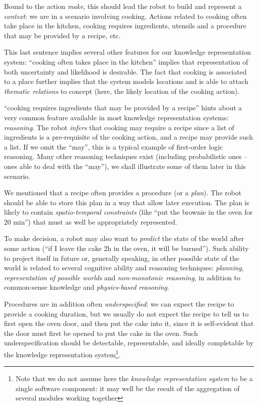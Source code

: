Bound to the action \emph{make}, this should lead the robot to build and
represent a \emph{context}: we are in a scenario involving cooking. Actions
related to cooking often take place in the kitchen, cooking requires ingredients, 
utensils and a procedure that may be provided by a recipe, etc.

This last sentence implies several other features for our knowledge
representation system: ``cooking often takes place in the kitchen'' implies
that representation of both uncertainty and likelihood is desirable. The fact
that cooking is associated to a place further implies that the system models
locations and is able to attach \emph{thematic relations} to concept
(here, the likely location of the cooking action).

``cooking requires ingredients that may be provided by a recipe'' hints about a
very common feature available in most knowledge representation systems:
\emph{reasoning}. The robot \emph{infers} that cooking may require a recipe
since a list of ingredients is a pre-requisite of the cooking action, and a
recipe may provide such a list. If we omit the ``may'', this is a typical
example of first-order logic reasoning. Many other reasoning techniques exist
(including probabilistic ones -- ones able to deal with the ``may''), we shall
illustrate some of them later in this scenario.

We mentioned that a recipe often provides a procedure (or a \emph{plan}). The robot
should be able to store this plan in a way that allow later execution.  The
plan is likely to contain \emph{spatio-temporal constraints} (like ``put
the brownie in the oven for 20 min'') that must as well be appropriately
represented.

To make decision, a robot may also want to \emph{predict} the state of the world
after some action (``if I leave the cake 2h in the oven, it will be burned'').
Such ability to project itself in future or, generally speaking, in other
possible state of the world is related to several cognitive ability and
reasoning techniques: \emph{planning}, \emph{representation of possible worlds}
and \emph{non-monotonic reasoning}, in addition to common-sense knowledge and
\emph{physics-based reasoning}.

Procedures are in addition often \emph{underspecified}: we can expect the recipe
to provide a cooking duration, but we usually do not expect the recipe to tell
us to first open the oven door, and then put the cake into it, since it is
self-evident that the door must first be opened to put the cake in the oven.
Such underspecification should be detectable, representable, and ideally
completable by the knowledge representation system\footnote{Note that we do not
assume here the {\it knowledge representation system} to be a single software
component: it may well be the result of the aggregation of several modules
working together}.

